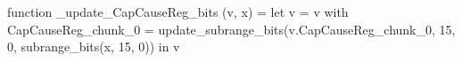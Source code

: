 function _update_CapCauseReg_bits (v, x) = let v = { v with CapCauseReg_chunk_0 = update_subrange_bits(v.CapCauseReg_chunk_0, 15, 0, subrange_bits(x, 15, 0)) } in
  v
